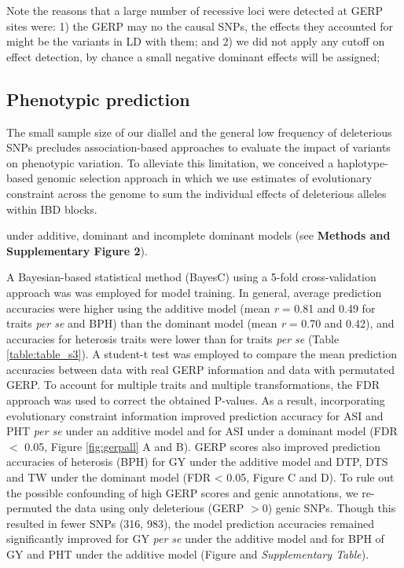 \documentclass[twoside,twocolumn, letterpaper]{article}
\begin{document}
Note the reasons that a large number of recessive loci were detected at GERP sites were: 1) the GERP may no the causal SNPs, the effects they accounted for might be the variants in LD with them; and 2) we did not apply any cutoff on effect detection, by chance a small negative dominant effects will be assigned;     





\subsection*{Phenotypic prediction}

 
The small sample size of our diallel and the general low frequency of deleterious SNPs precludes association-based approaches to evaluate the impact of variants on phenotypic variation.
To alleviate this limitation, we conceived a haplotype-based genomic selection approach in which we use estimates of evolutionary constraint across the genome to sum the individual effects of deleterious alleles within IBD blocks.

under additive, dominant and incomplete dominant models (see \textbf{Methods and Supplementary Figure 2}). %

A Bayesian-based statistical method (BayesC) \citep{habier2011extension} using a 5-fold cross-validation approach was was employed for model training. 
In general, average prediction accuracies were higher using the additive model (mean \emph{r} = 0.81 and 0.49 for traits \emph{per se} and BPH) than the dominant model (mean \emph{r} = 0.70 and 0.42), and accuracies for heterosis traits were lower than for traits \emph{per se} (Table \ref{table:table_s3}).  A student-t test was employed to compare the mean prediction accuracies between data with real GERP information and data with permutated GERP. To account for multiple traits and multiple transformations, the FDR approach was used to correct the obtained P-values. As a result, incorporating evolutionary constraint information improved prediction accuracy for ASI and PHT \emph{per se} under an additive model and for ASI under a dominant model (FDR $<$ 0.05, Figure \ref{fig:gerpall} A and B).
GERP scores also improved prediction accuracies of heterosis (BPH) for GY under the additive model and DTP, DTS and TW under the dominant model (FDR < 0.05, Figure C and D). 
To rule out the possible confounding of high GERP scores and genic annotations, we re-permuted the data using only deleterious (GERP $> 0$) genic SNPs.  
Though this resulted in fewer SNPs (316, 983), the model prediction accuracies remained significantly improved for GY \emph{per se} under the additive model and for BPH of GY and PHT under the additive model (Figure and \emph{Supplementary Table}). %
\end{document}
